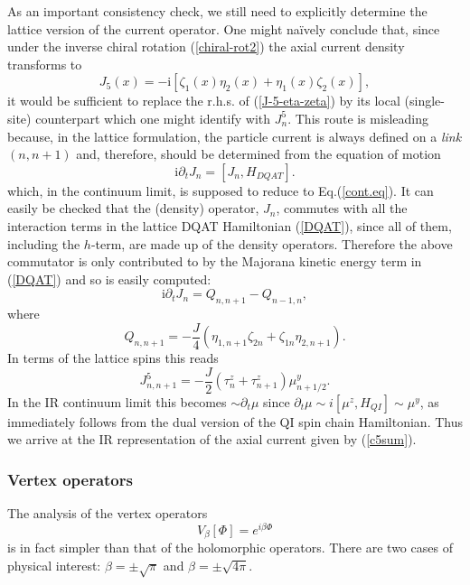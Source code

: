 As an important consistency check, we still need to explicitly
determine the lattice version of the current operator.
One might na\"{i}vely conclude that, since under the inverse chiral rotation
(\ref{chiral-rot2}) the axial current density transforms to
\begin{equation}
J_5 (x) = - \mbox{i} \left[\zeta_1 (x) \eta_2 (x) + \eta_1 (x) \zeta_2 (x)  \right],
\label{J-5-eta-zeta}
\end{equation}
it would be sufficient to replace the r.h.s. of (\ref{J-5-eta-zeta})
by its local (single-site) counterpart which one might identify with
$J^5 _n$. This route is misleading because, in the lattice formulation,
the particle current
is always defined on a {\sl link} $(n,n+1)$ and, therefore,
should be determined from the equation of motion
\begin{equation}
\mbox{i} \partial_t J_n = \left[J_n, H_{DQAT}\right].
\label{contl}
\end{equation}
which, in the continuum limit, is supposed to reduce to Eq.(\ref{cont.eq}).
It can easily be checked that the (density) operator, $J_n$,
commutes with all the interaction terms in the lattice
DQAT Hamiltonian (\ref{DQAT}), since all of them, including the $h$-term,
are made up of the density operators. Therefore the above
commutator is only contributed to by the Majorana kinetic energy term in
(\ref{DQAT}) and so is easily computed:
\begin{equation}
\mbox{i} \partial_t J_n = Q_{n,n+1} - Q_{n-1,n},
\end{equation}
where
\begin{equation} 
Q_{n,n+1} = - \frac{J}{4} \left(\eta_{1,n+1} \zeta_{2n} +
\zeta_{1n} \eta_{2,n+1} \right).
\end{equation}
In terms of the lattice spins this reads
\begin{equation}
J^5_{n,n+1}=-\frac{J}{2}(\tau^z_n+\tau^z_{n+1})\mu^y_{n+1/2}.
\label{jlattice}
\end{equation}
In the IR continuum limit this becomes $\sim \partial_t\mu$
since $\partial_t\mu\sim i[\mu^z,H_{QI}]\sim \mu^y$,
as immediately follows
from the dual version of the QI spin chain Hamiltonian.
Thus we arrive at the IR representation of the axial current given by
(\ref{c5sum}).

\subsubsection{Vertex operators}

The analysis of the vertex operators
\[
V_{\beta}[\Phi]=e^{i\beta\Phi}
\]
is in fact simpler than that of the holomorphic
operators. There are two cases of physical interest:
$\beta=\pm\sqrt{\pi}$
and $\beta=\pm \sqrt{4\pi}$.

